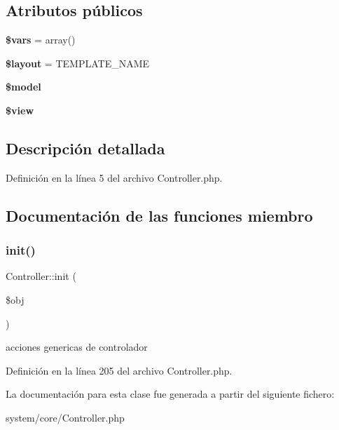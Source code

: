 \subsection*{Atributos públicos}
\begin{DoxyCompactItemize}
\item 
\mbox{\label{class_controller_a51a84d4b2aad22b65fca3976550fa31e}} 
{\bfseries \$vars} = array()
\item 
\mbox{\label{class_controller_aea20fa396e0fa1b8a500e7b8276e4d9a}} 
{\bfseries \$layout} = T\+E\+M\+P\+L\+A\+T\+E\+\_\+\+N\+A\+ME
\item 
\mbox{\label{class_controller_a4078f8d070afa3d19a462422fa1a3547}} 
{\bfseries \$model}
\item 
\mbox{\label{class_controller_aeb713d8b3c9bf61c72c4fcabd0e1e48a}} 
{\bfseries \$view}
\end{DoxyCompactItemize}


\subsection{Descripción detallada}


Definición en la línea 5 del archivo Controller.\+php.



\subsection{Documentación de las funciones miembro}
\mbox{\label{class_controller_a628beb30f4b8e9158a41e228671cf5aa}} 
\subsubsection{\texorpdfstring{init()}{init()}}
{\footnotesize\ttfamily Controller\+::init (\begin{DoxyParamCaption}\item[{}]{\$obj }\end{DoxyParamCaption})}

acciones genericas de controlador 

Definición en la línea 205 del archivo Controller.\+php.



La documentación para esta clase fue generada a partir del siguiente fichero\+:\begin{DoxyCompactItemize}
\item 
system/core/Controller.\+php\end{DoxyCompactItemize}
